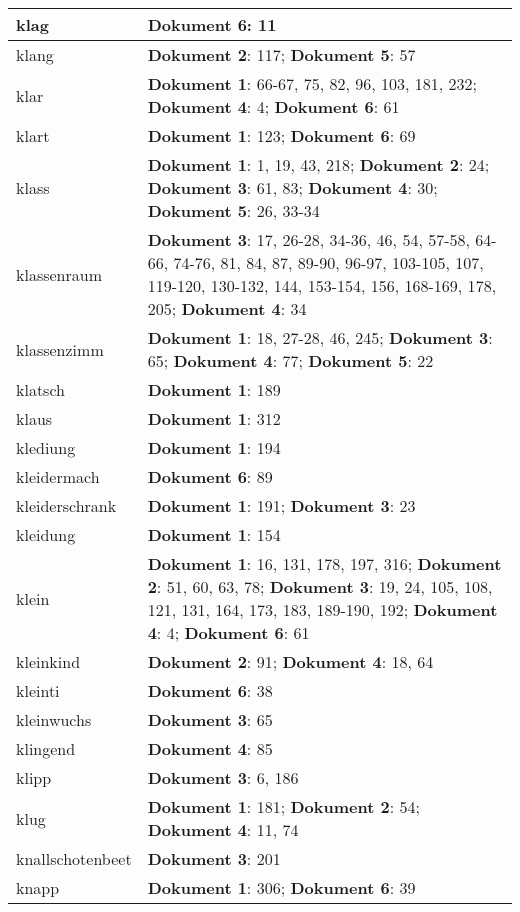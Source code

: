 \documentclass[a5paper]{article}
\begin{document}
\begin{longtable}[l]{|l|p{3in}|}
\hline
klag & \textbf{Dokument 6}: 11 \\
\hline
klang & \textbf{Dokument 2}: 117; \textbf{Dokument 5}: 57 \\
\hline
klar & \textbf{Dokument 1}: 66-67, 75, 82, 96, 103, 181, 232; \textbf{Dokument 4}: 4; \textbf{Dokument 6}: 61 \\
\hline
klart & \textbf{Dokument 1}: 123; \textbf{Dokument 6}: 69 \\
\hline
klass & \textbf{Dokument 1}: 1, 19, 43, 218; \textbf{Dokument 2}: 24; \textbf{Dokument 3}: 61, 83; \textbf{Dokument 4}: 30; \textbf{Dokument 5}: 26, 33-34 \\
\hline
klassenraum & \textbf{Dokument 3}: 17, 26-28, 34-36, 46, 54, 57-58, 64-66, 74-76, 81, 84, 87, 89-90, 96-97, 103-105, 107, 119-120, 130-132, 144, 153-154, 156, 168-169, 178, 205; \textbf{Dokument 4}: 34 \\
\hline
klassenzimm & \textbf{Dokument 1}: 18, 27-28, 46, 245; \textbf{Dokument 3}: 65; \textbf{Dokument 4}: 77; \textbf{Dokument 5}: 22 \\
\hline
klatsch & \textbf{Dokument 1}: 189 \\
\hline
klaus & \textbf{Dokument 1}: 312 \\
\hline
klediung & \textbf{Dokument 1}: 194 \\
\hline
kleidermach & \textbf{Dokument 6}: 89 \\
\hline
kleiderschrank & \textbf{Dokument 1}: 191; \textbf{Dokument 3}: 23 \\
\hline
kleidung & \textbf{Dokument 1}: 154 \\
\hline
klein & \textbf{Dokument 1}: 16, 131, 178, 197, 316; \textbf{Dokument 2}: 51, 60, 63, 78; \textbf{Dokument 3}: 19, 24, 105, 108, 121, 131, 164, 173, 183, 189-190, 192; \textbf{Dokument 4}: 4; \textbf{Dokument 6}: 61 \\
\hline
kleinkind & \textbf{Dokument 2}: 91; \textbf{Dokument 4}: 18, 64 \\
\hline
kleinti & \textbf{Dokument 6}: 38 \\
\hline
kleinwuchs & \textbf{Dokument 3}: 65 \\
\hline
klingend & \textbf{Dokument 4}: 85 \\
\hline
klipp & \textbf{Dokument 3}: 6, 186 \\
\hline
klug & \textbf{Dokument 1}: 181; \textbf{Dokument 2}: 54; \textbf{Dokument 4}: 11, 74 \\
\hline
knallschotenbeet & \textbf{Dokument 3}: 201 \\
\hline
knapp & \textbf{Dokument 1}: 306; \textbf{Dokument 6}: 39 \\

\end{longtable}
\end{document}
